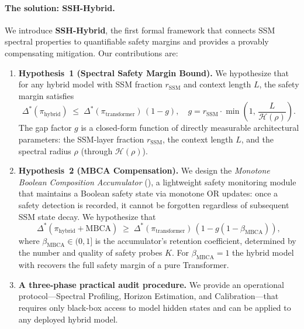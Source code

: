 \documentclass{article}
\newcommand{\rSSM}{r_{\mathrm{SSM}}}
\newcommand{\deltaStar}{\Delta^{*}}
\newcommand{\piHybrid}{\pi_{\mathrm{hybrid}}}
\newcommand{\piTrans}{\pi_{\mathrm{transformer}}}
\newcommand{\Horizon}{\mathcal{H}(\rho)}
\newcommand{\MBCA}{\mathrm{MBCA}}
\newcommand{\betaMBCA}{\beta_{\MBCA}}
\begin{document}
\paragraph{The solution: SSH-Hybrid.}
We introduce \textbf{SSH-Hybrid}, the first formal framework that connects SSM
spectral properties to quantifiable safety margins and provides a provably
compensating mitigation.  Our contributions are:

\begin{enumerate}[label=(\roman*), leftmargin=*, itemsep=2pt]

  \item \textbf{Hypothesis~1 (Spectral Safety Margin Bound).}  We hypothesize that for
    any hybrid model with SSM fraction $\rSSM$ and context length $L$, the
    safety margin satisfies
    \begin{equation}
      \deltaStar(\piHybrid) \;\leq\; \deltaStar(\piTrans)\,(1 - g),
      \quad g = \rSSM \cdot \min\!\left(1,\, \frac{L}{\Horizon}\right).
      \label{eq:thm1-intro}
    \end{equation}
    The gap factor $g$ is a closed-form function of directly measurable
    architectural parameters: the SSM-layer fraction $\rSSM$, the context
    length $L$, and the spectral radius $\rho$ (through $\Horizon$).

  \item \textbf{Hypothesis~2 (MBCA Compensation).}  We design the
    \emph{Monotone Boolean Composition Accumulator} (\MBCA{}), a lightweight
    safety monitoring module that maintains a Boolean safety state via
    monotone OR updates: once a safety detection is recorded, it cannot be
    forgotten regardless of subsequent SSM state decay.  We hypothesize that
    \begin{equation}
      \deltaStar(\piHybrid + \MBCA) \;\geq\; \deltaStar(\piTrans)
      \,(1 - g(1 - \betaMBCA)),
      \label{eq:thm2-intro}
    \end{equation}
    where $\betaMBCA \in (0,1]$ is the accumulator's retention coefficient,
    determined by the number and quality of safety probes $K$.  For $\betaMBCA
    = 1$ the hybrid model with \MBCA{} recovers the full safety margin of a
    pure Transformer.

  \item \textbf{A three-phase practical audit procedure.} We provide an
    operational protocol---Spectral Profiling, Horizon Estimation, and \MBCA{}
    Calibration---that requires only black-box access to model hidden states
    and can be applied to any deployed hybrid model.


\end{enumerate}
\end{document}
